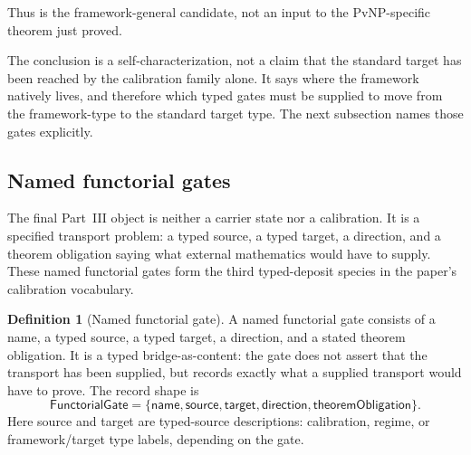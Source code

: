 \documentclass[11pt]{article}
\newcommand{\TDS}{typed-deposit species}
\theoremstyle{definition}
\newtheorem{definition}[theorem]{Definition}
\begin{document}
Thus  is the framework-general
candidate, not an input to the PvNP-specific theorem just proved.

The conclusion is a self-characterization, not a claim that the standard
target has been reached by the calibration family alone.  It says where
the framework natively lives, and therefore which typed gates must be
supplied to move from the framework-type to the standard target type.  The
next subsection names those gates explicitly.

\subsection{Named functorial gates}\label{sec:calibration:functorial-gates}

The final Part~III object is neither a carrier state nor a calibration.
It is a specified transport problem: a typed source, a typed target, a
direction, and a theorem obligation saying what external mathematics
would have to supply.  These named functorial gates form the third
\TDS{} in the paper's calibration vocabulary.

\begin{definition}[Named functorial gate]\label{def:functorial-gate}
A named functorial gate consists of a name, a typed source, a typed
target, a direction, and a stated theorem obligation.  It is a typed
bridge-as-content: the gate does not assert that the transport has been
supplied, but records exactly what a supplied transport would have to
prove.
The record shape is
\[
  \mathsf{FunctorialGate}
  =
  \{\mathsf{name},\mathsf{source},\mathsf{target},
    \mathsf{direction},\mathsf{theoremObligation}\}.
\]
Here source and target are typed-source descriptions: calibration,
regime, or framework/target type labels, depending on the gate.
\end{definition}
\end{document}
